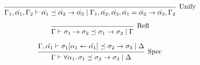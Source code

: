 \documentclass[12pt]{article}
\begin{document}
\pagestyle{empty}

\[
    \begin{prooftree}
        \infer0[Unify]{\Gamma_1, \hat{\alpha_1}, \Gamma_2 \vdash \hat{\alpha_1} \preceq \hat{\alpha_2} \to \hat{\alpha_3} \mid \Gamma_1, \hat{\alpha_2}, \hat{\alpha_3}, \hat{\alpha_1} = \hat{\alpha_2} \to \hat{\alpha_3}, \Gamma_2}
    \end{prooftree}
\]

\[
    \begin{prooftree}
        \infer0[Refl]{\Gamma \vdash \sigma_1 \to \sigma_2 \preceq \sigma_1 \to \sigma_2 \mid \Gamma}
    \end{prooftree}
\]

\[
    \begin{prooftree}
        \hypo{\Gamma, \hat{\alpha_1} \vdash \sigma_1[\alpha_1 \leftarrow \hat{\alpha_1}] \preceq \sigma_2 \to \sigma_3 \mid \Delta}
        \infer1[Spec]{\Gamma \vdash \forall \alpha_1\ldotp \sigma_1 \preceq \sigma_2 \to \sigma_3 \mid \Delta}
    \end{prooftree}
\]
\end{document}
